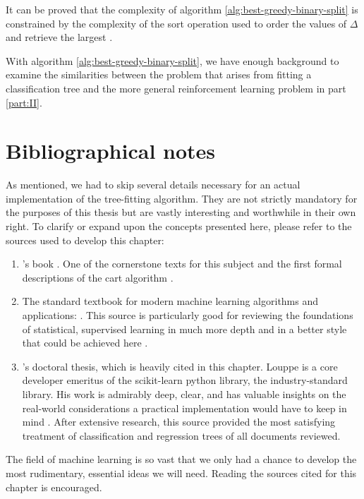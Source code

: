 It can be proved that the complexity of algorithm
\ref{alg:best-greedy-binary-split} is constrained by the complexity of the sort
operation used to order the values of $\Delta$ and retrieve the largest
\cite[Ch.~5]{louppe2014}.

With algorithm \ref{alg:best-greedy-binary-split}, we have enough background to
examine the similarities between the problem that arises from fitting a
classification tree and the more general reinforcement learning problem in part
\ref{part:II}.

\section{Bibliographical notes}
As mentioned, we had to skip several details necessary for an actual
implementation of the tree-fitting algorithm. They are not strictly mandatory
for the purposes of this thesis but are vastly interesting and worthwhile in
their own right. To clarify or expand upon the concepts presented here, please
refer to the sources used to develop this chapter:
\begin{enumerate}
    \item \citeauthor{breiman2017}'s book . One of the
        cornerstone texts for this subject and the first formal descriptions of
        the \ac{cart} algorithm \cite{breiman2017}.
    \item The standard textbook for modern machine learning algorithms and
        applications: . This source is particularly good
        for reviewing the foundations of statistical, supervised learning in
        much more depth and in a better style that could be achieved here
        \cite{elements2009}.
    \item \citeauthor{louppe2014}'s doctoral thesis, which is heavily cited in
        this chapter. Louppe is a core developer emeritus of the scikit-learn
        python library, the industry-standard library. His work is admirably
        deep, clear, and has valuable insights on the real-world considerations
        a practical implementation would have to keep in mind \cite{louppe2014}.
        After extensive research, this source provided the most satisfying
        treatment of classification and regression trees of all documents
        reviewed.
\end{enumerate}

The field of machine learning is so vast that we only had a chance to develop
the most rudimentary, essential ideas we will need. Reading the sources cited
for this chapter is encouraged.